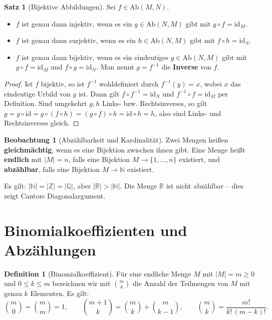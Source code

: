 ﻿\documentclass[a4paper,12pt]{report}
\theoremstyle{definition}
\newtheorem{definition}{Definition}
\newtheorem{satz}{Satz}
\newtheorem{beobachtung}{Beobachtung}
\begin{document}
\begin{satz}[Bijektive Abbildungen]
    Sei $f \in \mathrm{Ab}(M, N)$.
    \begin{itemize}
        \item[-] $f$ ist genau dann injektiv, wenn es ein $g \in \mathrm{Ab}(N, M)$
              gibt mit $g \circ f = \mathrm{id}_M$.
        \item[-] $f$ ist genau dann surjektiv, wenn es ein $h \in \mathrm{Ab}(N, M)$
              gibt mit $f \circ h = \mathrm{id}_N$.
        \item[-] $f$ ist genau dann bijektiv, wenn es ein eindeutiges $g \in \mathrm{Ab}(N, M)$
              gibt mit $g \circ f = \mathrm{id}_M$ und $f \circ g = \mathrm{id}_N$.
              Man nennt $g = f^{-1}$ die \textbf{Inverse} von $f$.
    \end{itemize}
\end{satz}
\begin{proof}
    Ist $f$ bijektiv, so ist $f^{-1}$ wohldefiniert durch $f^{-1}(y) = x$, wobei
    $x$ das eindeutige Urbild von $y$ ist. Dann gilt $f \circ f^{-1} = \mathrm{id}_N$
    und $f^{-1} \circ f = \mathrm{id}_M$ per Definition.
    Sind umgekehrt $g, h$ Links- bzw. Rechtsinverses, so gilt
    $g = g \circ \mathrm{id} = g \circ (f \circ h) = (g \circ f) \circ h
    = \mathrm{id} \circ h = h$,
    also sind Links- und Rechtsinverses gleich.
\end{proof}


\begin{beobachtung}[Abzählbarkeit und Kardinalität]
    Zwei Mengen heißen \textbf{gleichmächtig}, wenn es eine Bijektion zwischen
    ihnen gibt. Eine Menge heißt \textbf{endlich} mit $|M| = n$, falls eine
    Bijektion $M \to \{1, \dots, n\}$ existiert, und \textbf{abzählbar}, falls
    eine Bijektion $M \to \mathbb{N}$ existiert.

    Es gilt: $|\mathbb{N}| = |\mathbb{Z}| = |\mathbb{Q}|$, aber $|\mathbb{R}| > |\mathbb{N}|$.
    Die Menge $\mathbb{R}$ ist nicht abzählbar -- dies zeigt Cantors
    Diagonalargument.
\end{beobachtung}

\section{Binomialkoeffizienten und Abzählungen}

\begin{definition}[Binomialkoeffizient]
    Für eine endliche Menge $M$ mit $|M| = m \ge 0$ und $0 \le k \le m$
    bezeichnen wir mit $\binom{m}{k}$ die Anzahl der Teilmengen von $M$ mit
    genau $k$ Elementen. Es gilt:
    \[
        \binom{m}{0} = \binom{m}{m} = 1, \qquad
        \binom{m+1}{k} = \binom{m}{k} + \binom{m}{k-1}, \qquad
        \binom{m}{k} = \frac{m!}{k!\,(m-k)!}.
    \]
\end{definition}
\end{document}
